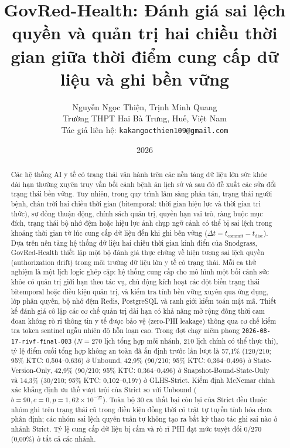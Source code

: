 \documentclass[11pt]{article}
\title{\textbf{GovRed-Health: Đánh giá sai lệch quyền và quản trị hai chiều thời gian giữa thời điểm cung cấp dữ liệu và ghi bền vững}}
\author{Nguyễn Ngọc Thiện, Trịnh Minh Quang \\ Trường THPT Hai Bà Trưng, Huế, Việt Nam \\
Tác giả liên hệ: \texttt{kakangocthien109@gmail.com}}
\date{2026}
\begin{document}
\maketitle

\begin{abstract}
Các hệ thống AI y tế có trạng thái vận hành trên các nền tảng dữ liệu lớn sức khỏe dài hạn thường xuyên truy vấn bối cảnh bệnh án lịch sử và sau đó đề xuất các sửa đổi trạng thái bền vững. Tuy nhiên, trong quy trình lâm sàng phân tán, trạng thái người bệnh, chân trời hai chiều thời gian (bitemporal: thời gian hiệu lực và thời gian tri thức), sự đồng thuận động, chính sách quản trị, quyền hạn vai trò, ràng buộc mục đích, trạng thái bộ nhớ đệm hoặc hiệu lực ảnh chụp ngữ cảnh có thể bị sai lệch trong khoảng thời gian từ lúc cung cấp dữ liệu đến khi ghi bền vững ($\Delta t = t_{\text{commit}} - t_{\text{disc}}$). Dựa trên nền tảng hệ thống dữ liệu hai chiều thời gian kinh điển của Snodgrass, GovRed-Health thiết lập một bộ đánh giá thực chứng về hiện tượng sai lệch quyền (authorization drift) trong môi trường dữ liệu lớn y tế có trạng thái. Mỗi ca thử nghiệm là một lịch logic ghép cặp: hệ thống cung cấp cho mô hình một bối cảnh sức khỏe có quản trị giới hạn theo tác vụ, chủ động kích hoạt các đột biến trạng thái bitemporal hoặc điều kiện quản trị, và kiểm tra tính bền vững xuyên qua ứng dụng, lớp phân quyền, bộ nhớ đệm Redis, PostgreSQL và ranh giới kiểm toán mật mã. Thiết kế đánh giá cô lập các cơ chế quản trị dài hạn có khả năng mở rộng đồng thời cam đoan không rò rỉ thông tin y tế được bảo vệ (zero-PHI leakage) thông qua cơ chế kiểm tra token sentinel ngẫu nhiên độ hỗn loạn cao. Trong đợt chạy niêm phong \texttt{2026-08-17-rivf-final-003} ($N=270$ lịch tổng hợp mỗi nhánh, 210 lịch chính có thể thực thi), tỷ lệ điểm cuối tổng hợp không an toàn đã ấn định trước lần lượt là 57,1\% (120/210; 95\% KTC: 0,504--0,636) ở Unbound, 42,9\% (90/210; 95\% KTC: 0,364--0,496) ở State-Version-Only, 42,9\% (90/210; 95\% KTC: 0,364--0,496) ở Snapshot-Bound-State-Only và 14,3\% (30/210; 95\% KTC: 0,102--0,197) ở GLHS-Strict. Kiểm định McNemar chính xác khẳng định ưu thế vượt trội của Strict so với Unbound ($b=90, c=0, p=1{,}62\times 10^{-27}$). Toàn bộ 30 ca thất bại còn lại của Strict đều thuộc nhóm ghi trên trạng thái cũ trong điều kiện đồng thời có trật tự tuyến tính hóa chưa phân định; các nhóm sai lệch quyền tuần tự không tạo ra bất kỳ thao tác ghi sai nào ở nhánh Strict. Tỷ lệ cung cấp dữ liệu bị cấm và rò rỉ PHI đạt mức tuyệt đối 0/270 (0,00\%) ở tất cả các nhánh.
\end{abstract}
\end{document}
